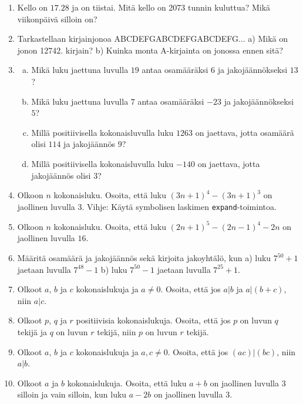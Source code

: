 \begin{enumerate}
\item Kello on $17.28$ ja on tiistai. Mitä kello on 2073 tunnin kuluttua? Mikä viikonpäivä silloin on?

\item Tarkastellaan kirjainjonoa ABCDEFGABCDEFGABCDEFG... a) Mikä on jonon 12742. kirjain? b) Kuinka monta A-kirjainta on jonossa ennen sitä?

\item 
\begin{enumerate}[a)]
\item Mikä luku jaettuna luvulla $19$ antaa osamääräksi $6$ ja jakojäännökseksi $13$?
\item Mikä luku jaettuna luvulla $7$ antaa osamääräksi $-23$ ja jakojäännökseksi $5$?
\item Millä positiivisella kokonaisluvulla luku $1263$ on jaettava, jotta osamäärä olisi $114$ ja jakojäännös $9$?
\item  Millä positiivisella kokonaisluvulla luku $-140$ on jaettava, jotta jakojäännös olisi $3$?
\end{enumerate}

\item Olkoon $n$ kokonaisluku. Osoita, että luku $(3n+1)^4 - (3n+1)^3$ on jaollinen luvulla 3. Vihje: Käytä symbolisen laskimen {\tt expand}-toimintoa.

\item Olkoon $n$ kokonaisluku. Osoita, että luku $(2n+1)^5 - (2n-1)^4-2n$ on jaollinen luvulla $16$.

\item Määritä osamäärä ja jakojäännös sekä kirjoita jakoyhtälö, kun a) luku $7^{50} + 1$ jaetaan luvulla $7^{48} - 1$ b) luku $7^{50} - 1$ jaetaan luvulla $7^{25} + 1$.

\newpage

\item Olkoot $a$, $b$ ja $c$ kokonaislukuja ja $a \neq 0$. Osoita, että jos $a|b$ ja $a|(b + c)$, niin $a|c$.

\item Olkoot $p$, $q$ ja $r$ positiivisia kokonaislukuja. Osoita, että jos $p$ on luvun $q$ tekijä ja $q$ on luvun $r$ tekijä, niin $p$ on luvun $r$ tekijä.

\item Olkoot $a$, $b$ ja $c$ kokonaislukuja ja $a, c \neq 0$. Osoita, että jos $(ac)|(bc)$, niin $a|b$.

\item Olkoot $a$ ja $b$ kokonaislukuja. Osoita, että luku $a + b$ on jaollinen luvulla $3$ silloin ja vain silloin, kun luku $a - 2b$ on jaollinen luvulla $3$.


\end{enumerate}
